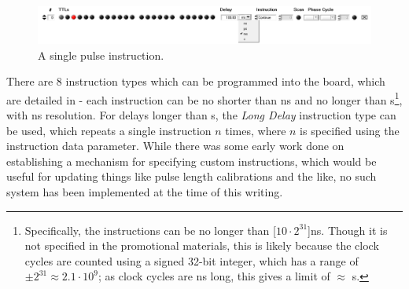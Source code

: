 \documentclass[PaulGanssle-Thesis.tex]{subfiles}
\begin{document}
\begin{figure}[!h]
\includegraphics[width=\textwidth]{figures/console/PulseInstruction.png}
\caption{A single pulse instruction.}
\label{fig:SinglePulseInstruction}
\end{figure}

There are 8 instruction types which can be programmed into the board, which are detailed in  - each instruction can be no shorter than \unit[100]{ns} and no longer than \unit[21]{s}\footnote{Specifically, the instructions can be no longer than \unit[$10\cdot{}2^{31}$]{ns}. Though it is not specified in the promotional materials, this is likely because the clock cycles are counted using a signed 32-bit integer, which has a range of $\pm{}2^{31} \approx 2.1\cdot{}10^{9}$; as clock cycles are \unit[10]{ns} long, this gives a limit of $\approx$ \unit[21]{s}.}, with \unit[10]{ns} resolution. For delays longer than \unit[21]{s}, the  \textit{Long Delay} instruction type can be used, which repeats a single instruction $n$ times, where $n$ is specified using the instruction data parameter. While there was some early work done on establishing a mechanism for specifying custom instructions, which would be useful for updating things like pulse length calibrations and the like, no such system has been implemented at the time of this writing.
\end{document}
